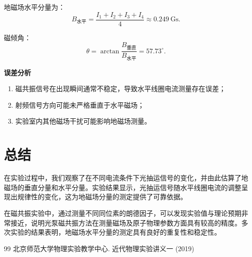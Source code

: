 \documentclass[a4paper, 1.5lines]{ctexart}
\begin{document}
地磁场水平分量为：
\[
B_{\text{水平}} = \frac{I_1 + I_2 + I_3 + I_4}{4} \approx 0.249\ \text{Gs}.
\]

磁倾角：
\[
\theta = \arctan\frac{B_{\text{垂直}}}{B_{\text{水平}}} = 57.73^\circ.
\]

\textbf{误差分析}
\begin{enumerate}
    \item 磁共振信号在出现瞬间通常不稳定，导致水平线圈电流测量存在误差；
    \item 射频信号方向可能未严格垂直于水平磁场；
    \item 实验室内其他磁场干扰可能影响地磁场测量。
\end{enumerate}

    \section{总结}
        在实验过程中，我们观察了在不同电流条件下光抽运信号的变化，并由此估算了地磁场的垂直分量和水平分量。实验结果显示，光抽运信号随水平线圈电流的调整呈现出规律性的变化，这为地磁场分量的测定提供了可靠依据。

在磁共振实验中，通过测量不同同位素的朗德因子，可以发现实验值与理论预期非常接近，说明光泵磁共振方法在测量磁场及原子物理参数方面具有较高的精度。多次实验的结果表明，地磁场水平分量的测定具有良好的重复性和稳定性。

    \begin{thebibliography}{99}
        北京师范大学物理实验教学中心. 近代物理实验讲义一 (2019)
    \end{thebibliography}

    
\end{document}
